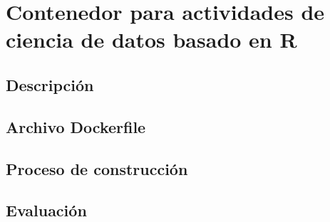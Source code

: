 \section{Contenedor para actividades de ciencia de datos basado en R}

\subsection{Descripción}

\subsection{Archivo Dockerfile}

\subsection{Proceso de construcción}


\subsection{Evaluación}